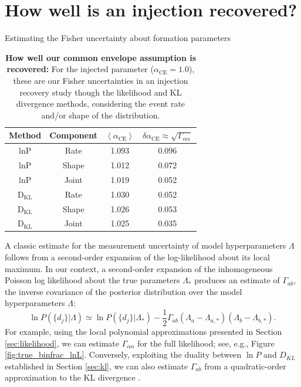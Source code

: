 \documentclass[twocolumn]{aastex631}
\newcommand\E[1]{{\left\langle #1 \right\rangle}}
\newcommand*{\alphaCE}{\alpha_{\mathrm{CE}}}
\begin{document}
 \section{How well is an injection recovered?}
\label{sec:goodness}
\begin{subsection}{Estimating the Fisher uncertainty about formation parameters}
\label{sec:fisher-alphaCE}
\begin{table}[!ht]
\centering
\begin{tabular}{|c|c|c|c|}
\hline
Method & Component & $\E{\alphaCE}$ & $\delta \alphaCE \approx \sqrt{\Gamma_{\alpha \alpha}}$ \\
\hline
$\mathrm{ln}\mathrm{P}$ & Rate & 1.093 & 0.096 \\
\hline
$\mathrm{ln}\mathrm{P}$ & Shape & 1.012 & 0.072 \\
\hline
$\mathrm{ln}\mathrm{P}$ & Joint & 1.019 & 0.052 \\
\hline
$\mathrm{D}_{\mathrm{KL}}$ & Rate & 1.030 & 0.052 \\
\hline
$\mathrm{D}_{\mathrm{KL}}$ & Shape & 1.026 & 0.053 \\
\hline
$\mathrm{D}_{\mathrm{KL}}$ & Joint & 1.025 & 0.035 \\
\hline
\end{tabular}
\caption{\label{tab:goodness}
\textbf{How well our common envelope assumption is recovered:}
For the injected parameter ($\alphaCE = 1.0$), these are our
    Fisher uncertainties in an injection recovery study though the 
    likelihood and KL divergence methods, considering
    the event rate and/or shape of the distribution.
}
\end{table}

A classic estimate for the measurement uncertainty of model hyperparameters 
    $\Lambda$ follows from a second-order
    expansion of the log-likelihood about its local maximum.  
In our context,
    a second-order expansion of the inhomogeneous Poisson log likelihood
    about the true parameters $\Lambda_*$ produces an estimate of
    $\Gamma_{ab}$,
    the inverse covariance of the posterior distribution over the model hyperparameters $\Lambda$:
\begin{equation}
\ln P(\{d_j\}|\Lambda) \simeq \ln P(\{d_j\}|\Lambda_*)  - \frac{1}{2} \Gamma_{ab}(\Lambda_a -\Lambda_{a,*})(\Lambda_b -\Lambda_{b,*}).
\end{equation}
For example, using the local polynomial approximations presented in 
    Section \ref{sec:likelihood}, 
    we can estimate $\Gamma_{\alpha\alpha}$ for the full likelihood;
    see, e.g., Figure \ref{fig:true_binfrac_lnL}.  
Conversely, exploiting the duality between $\ln P$ and $D_{KL}$ established in 
    Section \ref{sec:kl}, 
    we can also estimate $\Gamma_{ab}$ from a quadratic-order approximation to 
    the KL divergence \citep[see Eq. 15 of][]{1204.3117}.


\end{subsection}
\end{document}
